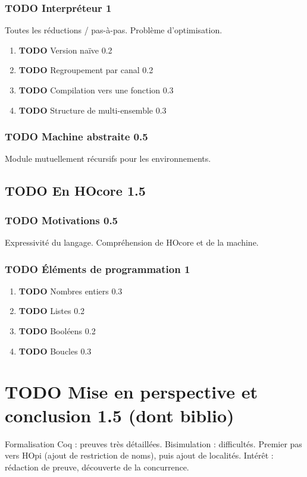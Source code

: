 \documentclass[11pt]{article}
\begin{document}
\subsubsection{{\bfseries\sffamily TODO} Interpréteur 1}
\label{sec-4-1-1}
Toutes les réductions / pas-à-pas.
Problème d'optimisation.
\begin{enumerate}
\item {\bfseries\sffamily TODO} Version naïve 0.2
\label{sec-4-1-1-1}
\item {\bfseries\sffamily TODO} Regroupement par canal 0.2
\label{sec-4-1-1-2}
\item {\bfseries\sffamily TODO} Compilation vers une fonction 0.3
\label{sec-4-1-1-3}
\item {\bfseries\sffamily TODO} Structure de multi-ensemble 0.3
\label{sec-4-1-1-4}
\end{enumerate}
\subsubsection{{\bfseries\sffamily TODO} Machine abstraite 0.5}
\label{sec-4-1-2}
Module mutuellement récursifs pour les environnements.
\subsection{{\bfseries\sffamily TODO} En HOcore 1.5}
\label{sec-4-2}
\subsubsection{{\bfseries\sffamily TODO} Motivations 0.5}
\label{sec-4-2-1}
Expressivité du langage.
Compréhension de HOcore et de la machine.
\subsubsection{{\bfseries\sffamily TODO} Éléments de programmation 1}
\label{sec-4-2-2}
\begin{enumerate}
\item {\bfseries\sffamily TODO} Nombres entiers 0.3
\label{sec-4-2-2-1}
\item {\bfseries\sffamily TODO} Listes 0.2
\label{sec-4-2-2-2}
\item {\bfseries\sffamily TODO} Booléens 0.2
\label{sec-4-2-2-3}
\item {\bfseries\sffamily TODO} Boucles 0.3
\label{sec-4-2-2-4}
\end{enumerate}


\section{{\bfseries\sffamily TODO} Mise en perspective et conclusion 1.5 (dont biblio)}
\label{sec-5}
Formalisation Coq : preuves très détaillées.
Bisimulation : difficultés.
Premier pas vers HOpi (ajout de restriction de noms), puis ajout de localités.
Intérêt : rédaction de preuve, découverte de la concurrence.

\printbibliography
\end{document}
